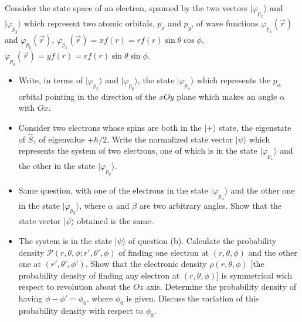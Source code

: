 \documentclass[10pt,a4paper]{article}
\newenvironment{problem}[2][Problem]{\begin{trivlist}
\item[\hskip \labelsep {\bfseries #1}\hskip \labelsep {\bfseries #2.}]}{\end{trivlist}}
\begin{document}
\begin{problem}{5}
[C-T Exercise 14-3] Consider the state space of an electron, spanned by the two vectors $|\varphi_{p_x}\rangle$ and $|\varphi_{p_y}\rangle$ which represent two atomic orbitals, $p_x$ and $p_y$, of wave functions $\varphi_{p_x}(\vec{r})$ and $\varphi_{p_y}(\vec{r})$, $\varphi_{p_x}(\vec{r})=xf(r)=rf(r)\sin\theta\cos\phi$, $\varphi_{p_y}(\vec{r})=yf(r)=rf(r)\sin\theta\sin\phi$.
\begin{itemize}
\item[(a)] Write, in terms of $|\varphi_{p_x}\rangle$ and $|\varphi_{p_y}\rangle$, the state $|\varphi_{p_{\alpha}}\rangle$ which represents the $p_{\alpha}$ orbital pointing in the direction of the $xOy$ plane which makes an angle $\alpha$ with $Ox$.
\item[(b)] Consider two electrons whose spins are both in the $|+\rangle$ state, the eigenstate of $\hat{S}_z$ of eigenvalue $+\hbar/2$. Write the normalized state vector $|\psi\rangle$ which represents the system of two electrons, one of which is in the state $|\varphi_{p_x}\rangle$ and the other in the state $|\varphi_{p_y}\rangle$.
\item[(c)] Same question, with one of the electrons in the state $|\varphi_{p_{\alpha}}\rangle$ and the other one in the state $|\varphi_{p_{\beta}}\rangle$, where $\alpha$ and $\beta$ are two arbitrary angles. Show that the state vector $|\psi\rangle$ obtained is the same.
\item[(d)] The system is in the state $|\psi\rangle$ of question (b). Calculate the probability density $\mathscr{P}(r,\theta,\phi;r',\theta',\phi)$ of finding one electron at $(r,\theta,\phi)$ and the other one at $(r',\theta',\phi')$. Show that the electronic density $\rho(r,\theta,\phi)$ [the probability density of finding any electron at $(r,\theta,\phi)$] is symmetrical wich respect to revolution about the $Oz$ axis. Determine the probability density of having $\phi-\phi'=\phi_0$, where $\phi_0$ is given. Discuss the variation of this probability density with respect to $\phi_0$.
\end{itemize}
\end{problem}
\end{document}
